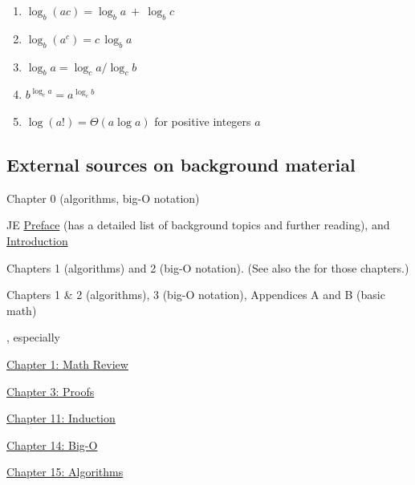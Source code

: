 \documentclass[11pt]{article}
\begin{document}
\begin{enumerate}
\item \(\log_b (ac) = \log_b a~+~\log_b c\)

\item \(\log_b (a^c) = c\,\log_b a\)

\item \(\log_b a = \log_c a / \log_c b\)  

\item $b^{\log_c a} = a^{\log_c b}$

\item $\log (a!) = \Theta(a\log a)$ for positive integers $a$  
  
\end{enumerate}

\subsection{External sources on background material}
\begin{mylist}[-]

\item \DPV Chapter 0 (algorithms, big-O notation)

\item JE
  \href{https://jeffe.cs.illinois.edu/teaching/algorithms/book/!!-frontmatter.pdf}{Preface}
  (has a detailed list of background topics and further reading), and
  \href{https://jeffe.cs.illinois.edu/teaching/algorithms/book/00-intro.pdf}{Introduction}

\item \KT Chapters 1 (algorithms) and 2 (big-O notation).
  (See also the \KWSlides for those chapters.)

\item \CLRS Chapters 1 \& 2 (algorithms), 3 (big-O notation), Appendices A and B (basic math)

\item \MF, especially
  \begin{mylist}
  \item
    \href{https://mfleck.cs.illinois.edu/building-blocks/version-1.3/math-review.pdf}{Chapter 1: Math Review}
  \item
    \href{https://mfleck.cs.illinois.edu/building-blocks/version-1.3/proofs.pdf}{Chapter 3: Proofs}
  \item
    \href{https://mfleck.cs.illinois.edu/building-blocks/version-1.3/induction.pdf}{Chapter 11: Induction}
  \item
    \href{https://mfleck.cs.illinois.edu/building-blocks/version-1.3/big-o.pdf}{Chapter 14: Big-O}
  \item
    \href{https://mfleck.cs.illinois.edu/building-blocks/version-1.3/algorithms.pdf}{Chapter 15: Algorithms}
  \end{mylist}
  
\end{mylist}
\end{document}
